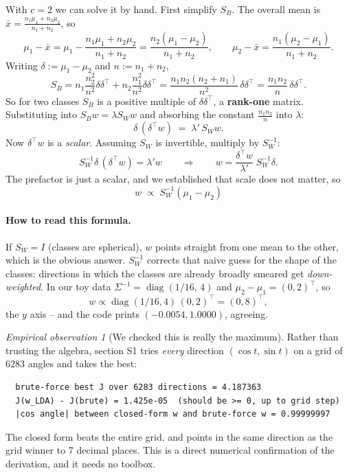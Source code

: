 \documentclass[11pt]{article}
\theoremstyle{definition}
\theoremstyle{remark}
\newtheorem*{observation}{Empirical observation}
\newcommand{\Sw}{S_W}
\newcommand{\Sb}{S_B}
\begin{document}
With $c=2$ we can solve it by hand. First simplify $\Sb$. The overall mean is
$\bar{x}=\frac{n_1\mu_1+n_2\mu_2}{n_1+n_2}$, so
\[
  \mu_1-\bar{x} = \mu_1 - \frac{n_1\mu_1+n_2\mu_2}{n_1+n_2}
            = \frac{n_2(\mu_1-\mu_2)}{n_1+n_2},
  \qquad
  \mu_2-\bar{x} = \frac{n_1(\mu_2-\mu_1)}{n_1+n_2}.
\]
Writing $\delta := \mu_1-\mu_2$ and $n:=n_1+n_2$,
\[
  \Sb = n_1\frac{n_2^2}{n^2}\delta\delta^{\!\top} + n_2\frac{n_1^2}{n^2}\delta\delta^{\!\top}
      = \frac{n_1n_2(n_2+n_1)}{n^2}\,\delta\delta^{\!\top}
      = \frac{n_1n_2}{n}\,\delta\delta^{\!\top}.
\]
So for two classes $\Sb$ is a positive multiple of $\delta\delta^{\!\top}$, a
\textbf{rank-one} matrix. Substituting into $\Sb w=\lambda\Sw w$ and absorbing the
constant $\frac{n_1n_2}{n}$ into $\lambda$:
\[
  \delta\,(\delta^{\!\top} w) \;=\; \lambda' \,\Sw w .
\]
Now $\delta^{\!\top} w$ is a \emph{scalar}. Assuming $\Sw$ is invertible, multiply by
$\Sw^{-1}$:
\[
  \Sw^{-1}\delta\,(\delta^{\!\top} w) = \lambda' w
  \qquad\Longrightarrow\qquad
  w = \frac{\delta^{\!\top} w}{\lambda'}\;\Sw^{-1}\delta .
\]
The prefactor is just a scalar, and we established that scale does not matter, so
\[
  \boxed{\;w \;\propto\; \Sw^{-1}(\mu_1-\mu_2)\;}
\]
\paragraph{How to read this formula.} If $\Sw = I$ (classes are spherical), $w$
points straight from one mean to the other, which is the obvious answer.
$\Sw^{-1}$ corrects that naive guess for the shape of the classes: directions in
which the classes are already broadly smeared get \emph{down-weighted}. In our toy
data $\Sigma^{-1}=\operatorname{diag}(1/16,\,4)$ and $\mu_2-\mu_1=(0,2)^{\!\top}$, so
\[
  w \propto \operatorname{diag}(1/16,4)\,(0,2)^{\!\top} = (0,8)^{\!\top},
\]
the $y$ axis -- and the code prints $(-0.0054, 1.0000)$, agreeing.

\begin{observation}[We checked this is really the maximum]
Rather than trusting the algebra, section S1 tries \emph{every} direction
$(\cos t,\sin t)$ on a grid of $6283$ angles and takes the best:
\begin{lstlisting}
  brute-force best J over 6283 directions = 4.187363
  J(w_LDA) - J(brute) = 1.425e-05  (should be >= 0, up to grid step)
  |cos angle| between closed-form w and brute-force w = 0.99999997
\end{lstlisting}
The closed form beats the entire grid, and points in the same direction as the grid
winner to 7 decimal places. This is a direct numerical confirmation of the
derivation, and it needs no toolbox.
\end{observation}
\end{document}
